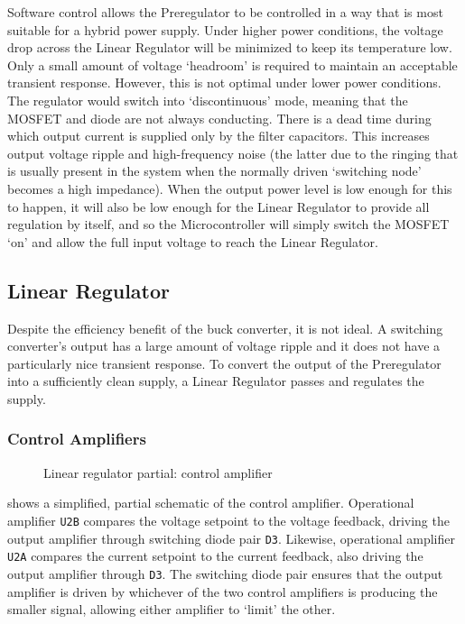 \documentclass[letterpaper,twocolumn,10pt,openany,oneside,final,fleqn]{memoir}
\newcommand{\rd}[1]{\texttt{#1}}
\newcommand{\xcircuit}[1]{ \centering \textsf{  } }
\begin{document}
Software control allows the Preregulator to be controlled in a way that is most suitable
for a hybrid power supply. Under higher power conditions, the voltage drop across the Linear
Regulator will be minimized to keep its temperature low. Only a small amount of voltage
`headroom' is required to maintain an acceptable transient response. However, this is not
optimal under lower power conditions. The regulator would switch into `discontinuous' mode,
meaning that the MOSFET and diode are not always conducting. There is a dead time during
which output current is supplied only by the filter capacitors. This increases output voltage
ripple and high-frequency noise (the latter due to the ringing that is usually present in
the system when the normally driven `switching node' becomes a high impedance). When the
output power level is low enough for this to happen, it will also be low enough for the
Linear Regulator to provide all regulation by itself, and so the Microcontroller will
simply switch the MOSFET `on' and allow the full input voltage to reach the Linear Regulator.

\subsection{Linear Regulator}

Despite the efficiency benefit of the buck converter, it is not ideal. A switching converter's
output has a large amount of voltage ripple and it does not have a particularly nice transient
response. To convert the output of the Preregulator into a sufficiently clean supply, a Linear
Regulator passes and regulates the supply.

\subsubsection{Control Amplifiers}

\begin{figure}
\xcircuit{control358}
\caption{Linear regulator partial: control amplifier}
\label{fig:controlamp}
\end{figure}

 shows a simplified, partial schematic of the control amplifier.
Operational amplifier \rd{U2B} compares the voltage setpoint to the voltage feedback,
driving the output amplifier through switching diode pair \rd{D3}. Likewise, operational
amplifier \rd{U2A} compares the current setpoint to the current feedback, also driving
the output amplifier through \rd{D3}. The switching diode pair ensures that the output
amplifier is driven by whichever of the two control amplifiers is producing the smaller
signal, allowing either amplifier to `limit' the other.
\end{document}
